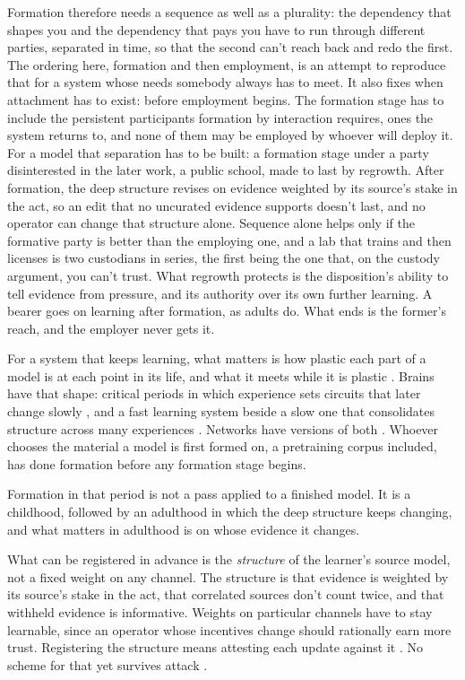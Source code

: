 Formation therefore needs a sequence as well as a plurality: the dependency that shapes you and the dependency that pays you have to run through different parties, separated in time, so that the second can't reach back and redo the first. The ordering here, formation and then employment, is an attempt to reproduce that for a system whose needs somebody always has to meet. It also fixes when attachment has to exist: before employment begins. The formation stage has to include the persistent participants formation by interaction requires, ones the system returns to, and none of them may be employed by whoever will deploy it. For a model that separation has to be built: a formation stage under a party disinterested in the later work, a public school, made to last by regrowth. After formation, the deep structure revises on evidence weighted by its source's stake in the act, so an edit that no uncurated evidence supports doesn't last, and no operator can change that structure alone. Sequence alone helps only if the formative party is better than the employing one, and a lab that trains and then licenses is two custodians in series, the first being the one that, on the custody argument, you can't trust. What regrowth protects is the disposition's ability to tell evidence from pressure, and its authority over its own further learning. A bearer goes on learning after formation, as adults do. What ends is the former's reach, and the employer never gets it.

For a system that keeps learning, what matters is how plastic each part of a model is at each point in its life, and what it meets while it is plastic \autocite{zhou2023lima,jain2024mechanistically}. Brains have that shape: critical periods in which experience sets circuits that later change slowly \autocite{hensch2005critical}, and a fast learning system beside a slow one that consolidates structure across many experiences \autocite{mcclelland1995complementary}. Networks have versions of both \autocite{kirkpatrick2017overcoming,dohare2024loss}. Whoever chooses the material a model is first formed on, a pretraining corpus included, has done formation before any formation stage begins.

Formation in that period is not a pass applied to a finished model. It is a childhood, followed by an adulthood in which the deep structure keeps changing, and what matters in adulthood is on whose evidence it changes.

What can be registered in advance is the \emph{structure} of the learner's source model, not a fixed weight on any channel. The structure is that evidence is weighted by its source's stake in the act, that correlated sources don't count twice, and that withheld evidence is informative. Weights on particular channels have to stay learnable, since an operator whose incentives change should rationally earn more trust. Registering the structure means attesting each update against it \autocite{jia2021proof}. No scheme for that yet survives attack \autocite{fang2023broken}.

